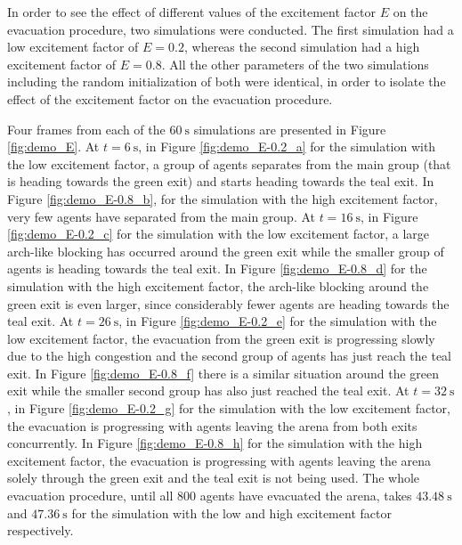 In order to see the effect of different values of the excitement factor $E$ on the evacuation procedure, two simulations were conducted. The first simulation had a low excitement factor of $E=0.2$, whereas the second simulation had a high excitement factor of $E=0.8$. All the other parameters of the two simulations including the random initialization of both were identical, in order to isolate the effect of the excitement factor on the evacuation procedure.

Four frames from each of the $\SI{60}{\second}$ simulations are presented in Figure \ref{fig:demo_E}. At $t=\SI{6}{\second}$, in Figure \ref{fig:demo_E-0.2_a} for the simulation with the low excitement factor, a group of agents separates from the main group (that is heading towards the green exit) and starts heading towards the teal exit. In Figure \ref{fig:demo_E-0.8_b}, for the simulation with the high excitement factor, very few agents have separated from the main group. At $t=\SI{16}{\second}$, in Figure \ref{fig:demo_E-0.2_c} for the simulation with the low excitement factor, a large arch-like blocking has occurred around the green exit while the smaller group of agents is heading towards the teal exit. In Figure \ref{fig:demo_E-0.8_d} for the simulation with the high excitement factor, the arch-like blocking around the green exit is even larger, since considerably fewer agents are heading towards the teal exit. At $t=\SI{26}{\second}$, in Figure \ref{fig:demo_E-0.2_e} for the simulation with the low excitement factor, the evacuation from the green exit is progressing slowly due to the high congestion and the second group of agents has just reach the teal exit. In Figure \ref{fig:demo_E-0.8_f} there is a similar situation around the green exit while the smaller second group has also just reached the teal exit. At $t=\SI{32}{\second}$, in Figure \ref{fig:demo_E-0.2_g} for the simulation with the low excitement factor, the evacuation is progressing with agents leaving the arena from both exits concurrently. In Figure \ref{fig:demo_E-0.8_h} for the simulation with the high excitement factor, the evacuation is progressing with agents leaving the arena solely through the green exit and the teal exit is not being used. The whole evacuation procedure, until all $800$ agents have evacuated the arena, takes $\SI{43.48}{\second}$ and $\SI{47.36}{\second}$ for the simulation with the low and high excitement factor respectively.

